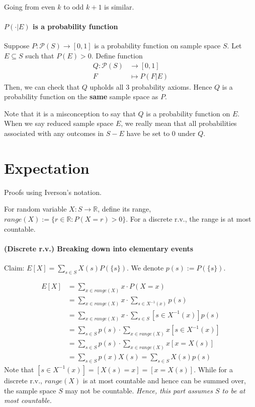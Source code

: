 \documentclass{article}
\begin{document}
Going from even $k$ to odd $k+1$ is similar.

\paragraph{$P(\cdot | E)$ is a probability function}
Suppose $P: \mathcal{P}(S)\rightarrow [0,1]$ is a probability function on sample space $S$. Let $E\subseteq S$ such that $P(E) > 0$. Define function
\begin{align*}
	Q: \mathcal{P}(S)&\rightarrow [0,1]\\
		F&\mapsto P(F|E)
\end{align*}
Then, we can check that $Q$ upholds all 3 probability axioms. Hence $Q$ is a probability function on the \textbf{same} sample space as $P$.

Note that it is a misconception to say that $Q$ is a probability function on $E$. When we say reduced sample space $E$, we really mean that all probabilities associated with any outcomes in $S-E$ have be set to $0$ under $Q$.


\section{Expectation}
Proofs using Iverson's notation.

For random variable $X: S\rightarrow \mathbb{R}$, define its range, $range(X) := \{r\in \mathbb{R} : P(X=r) > 0\}$. For a discrete r.v., the range is at most countable.

\paragraph{(Discrete r.v.) Breaking down into elementary events} Claim: $E[X] = \sum_{s\in S}X(s)P(\{s\})$. We denote $p(s):=P(\{s\})$.

\begin{align*}
	E[X] &= \sum_{x\in range(X)}x\cdot P(X=x)\\
	&= \sum_{x\in range(X)}x\cdot \sum_{s\in X^{-1}(x)}p(s)\\
	&= \sum_{x\in range(X)}x\cdot \sum_{s\in S}[s\in X^{-1}(x)]p(s)\\
	&= \sum_{s\in S}p(s)\cdot \sum_{x\in range(X)}x[s\in X^{-1}(x)]\\
	&= \sum_{s\in S}p(s)\cdot \sum_{x\in range(X)}x[x=X(s)]\\
	&= \sum_{s\in S}p(x)X(s) = \sum_{s\in S}X(s)p(s)
\end{align*}
Note that $[s\in X^{-1}(x)] = [X(s) = x] = [x = X(s)]$. While for a discrete r.v., $range(X)$ is at most countable and hence can be summed over, the sample space $S$ may not be countable. \textit{Hence, this part assumes $S$ to be at most countable.}
\end{document}

